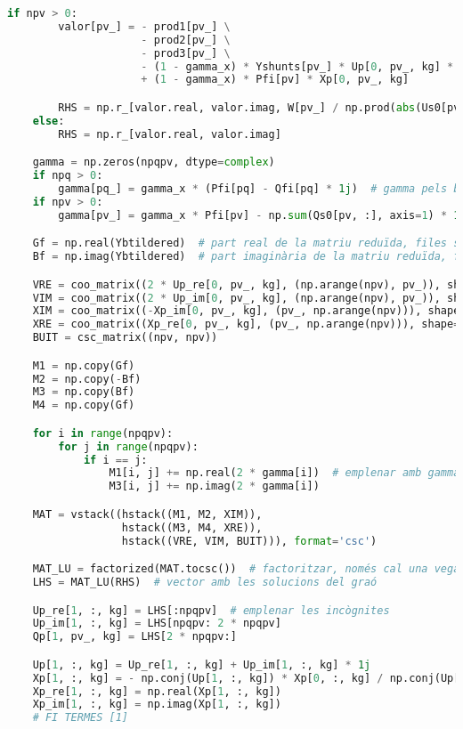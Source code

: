 \begin{lstlisting}[language=Python,numbers=none]
    if npv > 0:
        valor[pv_] = - prod1[pv_] \
                     - prod2[pv_] \
                     - prod3[pv_] \
                     - (1 - gamma_x) * Yshunts[pv_] * Up[0, pv_, kg] * np.prod(abs(Us0[pv, :kg + 1]), axis=1) ** 2 \
                     + (1 - gamma_x) * Pfi[pv] * Xp[0, pv_, kg]

        RHS = np.r_[valor.real, valor.imag, W[pv_] / np.prod(abs(Us0[pv, :kg + 1]), axis=1) ** 2 - 1]  # vector de la dreta del sistema d'equacions
    else:
        RHS = np.r_[valor.real, valor.imag]

    gamma = np.zeros(npqpv, dtype=complex)
    if npq > 0:
        gamma[pq_] = gamma_x * (Pfi[pq] - Qfi[pq] * 1j)  # gamma pels busos PQ
    if npv > 0:
        gamma[pv_] = gamma_x * Pfi[pv] - np.sum(Qs0[pv, :], axis=1) * 1j  # gamma pels busos PV

    Gf = np.real(Ybtildered)  # part real de la matriu reduïda, files sumen 0
    Bf = np.imag(Ybtildered)  # part imaginària de la matriu reduïda, files sumen 0

    VRE = coo_matrix((2 * Up_re[0, pv_, kg], (np.arange(npv), pv_)), shape=(npv, npqpv)).tocsc()  # en forma de blocs
    VIM = coo_matrix((2 * Up_im[0, pv_, kg], (np.arange(npv), pv_)), shape=(npv, npqpv)).tocsc()
    XIM = coo_matrix((-Xp_im[0, pv_, kg], (pv_, np.arange(npv))), shape=(npqpv, npv)).tocsc()
    XRE = coo_matrix((Xp_re[0, pv_, kg], (pv_, np.arange(npv))), shape=(npqpv, npv)).tocsc()
    BUIT = csc_matrix((npv, npv))

    M1 = np.copy(Gf)
    M2 = np.copy(-Bf)
    M3 = np.copy(Bf)
    M4 = np.copy(Gf)

    for i in range(npqpv):
        for j in range(npqpv):
            if i == j:
                M1[i, j] += np.real(2 * gamma[i])  # emplenar amb gamma
                M3[i, j] += np.imag(2 * gamma[i])

    MAT = vstack((hstack((M1, M2, XIM)),
                  hstack((M3, M4, XRE)),
                  hstack((VRE, VIM, BUIT))), format='csc')

    MAT_LU = factorized(MAT.tocsc())  # factoritzar, només cal una vegada
    LHS = MAT_LU(RHS)  # vector amb les solucions del graó

    Up_re[1, :, kg] = LHS[:npqpv]  # emplenar les incògnites
    Up_im[1, :, kg] = LHS[npqpv: 2 * npqpv]
    Qp[1, pv_, kg] = LHS[2 * npqpv:]

    Up[1, :, kg] = Up_re[1, :, kg] + Up_im[1, :, kg] * 1j
    Xp[1, :, kg] = - np.conj(Up[1, :, kg]) * Xp[0, :, kg] / np.conj(Up[0, :, kg])
    Xp_re[1, :, kg] = np.real(Xp[1, :, kg])
    Xp_im[1, :, kg] = np.imag(Xp[1, :, kg])
    # FI TERMES [1]



\end{lstlisting}
